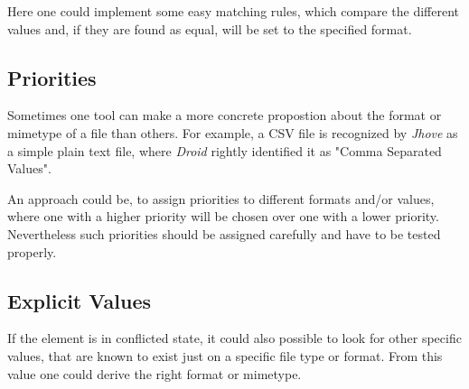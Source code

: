 \documentclass[a4paper,12pt]{article}
\begin{document}
Here one could implement some easy matching rules, which compare the different values and, if they are found as equal, will be set to the specified format.
	
\subsection{Priorities}

Sometimes one tool can make a more concrete propostion about the format or mimetype of a file than others. For example, a CSV file is recognized by \emph{Jhove} as a simple plain text file, where \emph{Droid} rightly identified it as "Comma Separated Values".

An approach could be, to assign priorities to different formats and/or values, where one with a higher priority will be chosen over one with a lower priority. Nevertheless such priorities should be assigned carefully and have to be tested properly.

\subsection{Explicit Values}

If the element is in conflicted state, it could also possible to look for other specific values, that are known to exist just on a specific file type or format. From this value one could derive the right format or mimetype.
\end{document}
